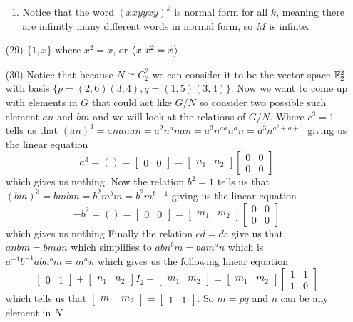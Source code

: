 \documentclass[12pt]{amsart}
\begin{document}
\begin{itemize}
\begin{enumerate}[label=(\alph*)]
        \item Notice that the word $(xxyyxy)^k$ is normal form for all $k$, meaning there 
        are infinitly many different words in normal form, so $M$ is infinte.
    \end{enumerate}
    \item[(29)] $\{1,x\}$ where $x^2=x$, or $\left\langle x|x^2=x \right\rangle$
    \item[(30)] Notice that because $N\cong C_2^2$ we can consider it to be the 
    vector space $\mathbb{F}_2^2$ with basis $\{p=(2,6)(3,4),q=(1,5)(3,4)\}$. Now we want to come up with
    elements in $G$ that could act like $G/N$ so consider two possible such element $an$ and $bm$ 
    and we will look at the relations of $G/N$. Where $c^3=1$ tells us that 
    $(an)^3= ananan=a^2n^anan=a^3n^{aa}n^an=a^3n^{a^2+a+1}$ giving us the linear equation
    \[a^3=()=\begin{bmatrix}0& 0\end{bmatrix}=\begin{bmatrix}n_1& n_2\end{bmatrix}\begin{bmatrix}0& 0\\0&0\end{bmatrix}\]
    which gives us nothing. Now the relation $b^2=1$ tells us that 
    $(bm)^3= bmbm=b^2m^bm=b^2m^{b+1}$ giving us the linear equation
    \[-b^2=()=\begin{bmatrix}0& 0\end{bmatrix}=\begin{bmatrix}m_1& m_2\end{bmatrix}\begin{bmatrix}0& 0\\0&0\end{bmatrix}\]
    which gives us nothing
    Finally the relation $cd=dc$ give us that $anbm=bman$ which simplifies to $abn^bm=bam^an$
    which is $a^{-1}b^{-1}abn^bm=m^an$ which gives us the following linear equation
    \[\begin{bmatrix}0& 1\end{bmatrix}+\begin{bmatrix}n_1& n_2\end{bmatrix}I_2+\begin{bmatrix}m_1& m_2\end{bmatrix}=\begin{bmatrix}m_1& m_2\end{bmatrix}\begin{bmatrix}1& 1\\1&0\end{bmatrix}\]
    which tells us that $\begin{bmatrix}m_1& m_2\end{bmatrix}=\begin{bmatrix}1& 1\end{bmatrix}$.
    So $m=pq$ and $n$ can be any element in $N$
     
\end{itemize}
\end{document}
